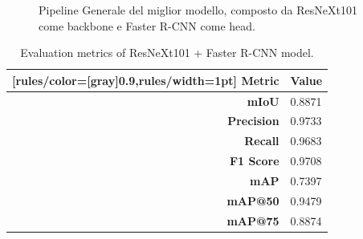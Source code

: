 \documentclass[minted, draw]{../tex/hebdomon}
\begin{document}
%
\begin{figure}[ht]
	\centering
	
	\caption{Pipeline Generale del miglior modello, composto da ResNeXt101 come backbone e Faster R-CNN come head.}
	\label{fig:model_best}
\end{figure}
%

%
\begin{table}[H]
	\begin{NiceTabular}{rX}[rules/color=[gray]{0.9},rules/width=1pt]
		\CodeBefore
		\Body
		\toprule
		\textbf{Metric}      & \textbf{Value}                                \\
		\midrule
		\textbf{mIoU} & 0.8871 \\
		\textbf{Precision} & 0.9733 \\
		\textbf{Recall} & 0.9683 \\
		\textbf{F1 Score} & 0.9708 \\
		\midrule
		\textbf{mAP} & 0.7397 \\
		\textbf{mAP@50} & 0.9479 \\
		\textbf{mAP@75} & 0.8874 \\
		\bottomrule
	\end{NiceTabular}
	\caption{Evaluation metrics of ResNeXt101 + Faster R-CNN model.}
\end{table}
%



\end{document}
